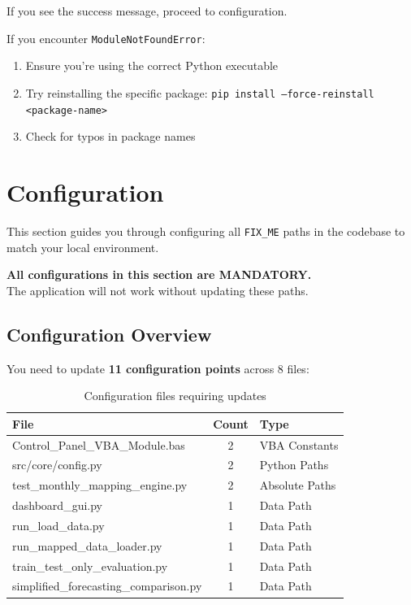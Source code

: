 \documentclass[11pt,a4paper]{article}
\begin{document}
If you see the success message, proceed to configuration.

\begin{warningbox}[title=Troubleshooting: Import Errors]
If you encounter \texttt{ModuleNotFoundError}:
\begin{enumerate}
    \item Ensure you're using the correct Python executable
    \item Try reinstalling the specific package: \texttt{pip install --force-reinstall <package-name>}
    \item Check for typos in package names
\end{enumerate}
\end{warningbox}

\newpage

\section{Configuration}

This section guides you through configuring all \texttt{FIX\_ME} paths in the codebase to match your local environment.

\begin{warningbox}[title=Critical Step]
\textbf{All configurations in this section are MANDATORY.}\\
The application will not work without updating these paths.
\end{warningbox}

\subsection{Configuration Overview}

You need to update \textbf{11 configuration points} across 8 files:

\begin{table}[h]
\centering
\small
\begin{tabular}{@{} l c l @{}}
\toprule
\textbf{File} & \textbf{Count} & \textbf{Type} \\
\midrule
Control\_Panel\_VBA\_Module.bas & 2 & VBA Constants \\
src/core/config.py & 2 & Python Paths \\
test\_monthly\_mapping\_engine.py & 2 & Absolute Paths \\
dashboard\_gui.py & 1 & Data Path \\
run\_load\_data.py & 1 & Data Path \\
run\_mapped\_data\_loader.py & 1 & Data Path \\
train\_test\_only\_evaluation.py & 1 & Data Path \\
simplified\_forecasting\_comparison.py & 1 & Data Path \\
\bottomrule
\end{tabular}
\caption{Configuration files requiring updates}
\end{table}
\end{document}
